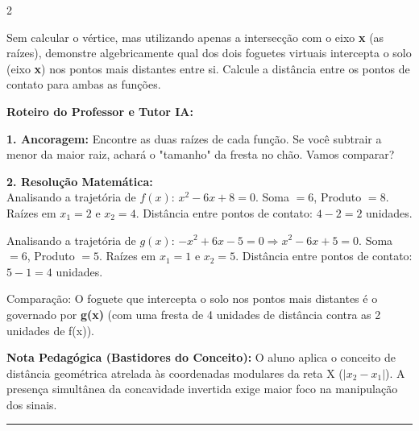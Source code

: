 \begin{multicols*}{2}
\begin{enunciadoLiteral}
Sem calcular o vértice, mas utilizando apenas a intersecção com o eixo \textbf{x} (as raízes), demonstre algebricamente qual dos dois foguetes virtuais intercepta o solo (eixo \textbf{x}) nos pontos mais distantes entre si. Calcule a distância entre os pontos de contato para ambas as funções.
\end{enunciadoLiteral}

\ifgabarito
    \begin{tcolorbox}[colback=CorTitUm!5, colframe=CorTitUm, boxrule=1pt, arc=4pt, left=6pt, right=6pt, top=6pt, bottom=6pt]
    \small\textbf{\textcolor{CorTitUm}{Roteiro do Professor e Tutor IA:}}\par\vspace{0.1cm}
    \color{CinzaEscuro}
    \textbf{1. Ancoragem:} Encontre as duas raízes de cada função. Se você subtrair a menor da maior raiz, achará o "tamanho" da fresta no chão. Vamos comparar?\par\vspace{0.1cm}
    \textbf{2. Resolução Matemática:}\\
    Analisando a trajetória de $f(x)$:
    $x^2 - 6x + 8 = 0$. 
    Soma $= 6$, Produto $= 8$. Raízes em $x_1=2$ e $x_2=4$.
    Distância entre pontos de contato: $4 - 2 = 2$ unidades.
    
    Analisando a trajetória de $g(x)$:
    $-x^2 + 6x - 5 = 0 \Rightarrow x^2 - 6x + 5 = 0$. 
    Soma $= 6$, Produto $= 5$. Raízes em $x_1=1$ e $x_2=5$.
    Distância entre pontos de contato: $5 - 1 = 4$ unidades.
    
    Comparação: O foguete que intercepta o solo nos pontos mais distantes é o governado por \textbf{g(x)} (com uma fresta de 4 unidades de distância contra as 2 unidades de f(x)).
    \end{tcolorbox}
    \vspace{0.15cm}
    
    \begin{boxexplicacao}
    \textbf{Nota Pedagógica (Bastidores do Conceito):} O aluno aplica o conceito de distância geométrica atrelada às coordenadas modulares da reta X ($|x_2 - x_1|$). A presença simultânea da concavidade invertida exige maior foco na manipulação dos sinais.
    \end{boxexplicacao}
\fi

\par\vspace{\espacoQuestao}
\noindent\textcolor{CorLinha}{\rule{\linewidth}{0.5pt}} 
\par\vspace{\espacoPreQuestao}

\end{multicols*}
